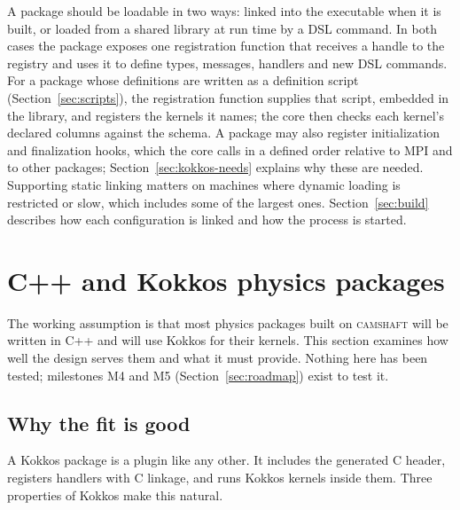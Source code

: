 \documentclass[11pt,a4paper]{article}
\newcommand{\camshaft}{\textsc{camshaft}}
\begin{document}
A package should be loadable in two ways: linked into the executable when it
is built, or loaded from a shared library at run time by a DSL command.  In
both cases the package exposes one registration function that receives a
handle to the registry and uses it to define types, messages, handlers and new
DSL commands.  For a package whose definitions are written as a definition
script (Section~\ref{sec:scripts}), the registration function supplies that
script, embedded in the library, and registers the kernels it names; the
core then checks each kernel's declared columns against the schema.  A package may also register initialization and finalization
hooks, which the core calls in a defined order relative to MPI and to other
packages; Section~\ref{sec:kokkos-needs} explains why these are needed.
Supporting static linking matters on machines where dynamic loading is
restricted or slow, which includes some of the largest ones.
Section~\ref{sec:build} describes how each configuration is linked and how
the process is started.

\section{C++ and Kokkos physics packages}
\label{sec:kokkos}

The working assumption is that most physics packages built on \camshaft{} will be
written in C++ and will use Kokkos for their kernels.  This section examines
how well the design serves them and what it must provide.  Nothing here has
been tested; milestones M4 and M5 (Section~\ref{sec:roadmap}) exist to test
it.

\subsection{Why the fit is good}

A Kokkos package is a plugin like any other.  It includes the generated C
header, registers handlers with C linkage, and runs Kokkos kernels inside
them.  Three properties of Kokkos make this natural.
\end{document}

